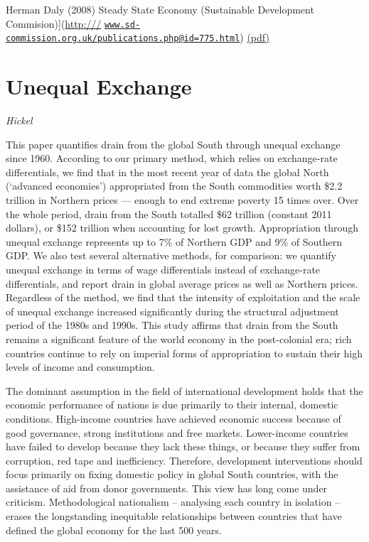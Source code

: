 \documentclass[
]{book}
\begin{document}
Herman Daly (2008) Steady State Economy (Sustainable Development Commision){]}(\url{http:///}
\href{mailto:www.sd-commission.org.uk/publications.php@id=775.html}{\nolinkurl{www.sd-commission.org.uk/publications.php@id=775.html}})
\href{pdf/Daly_2008_Steady_State_Economy_SD_Commision.pdf}{(pdf)}

\hypertarget{unequal-exchange}{%
\section{Unequal Exchange}\label{unequal-exchange}}

\emph{Hickel}

This paper quantifies drain from the global South through unequal
exchange since 1960. According to our primary method, which relies on
exchange-rate differentials, we find that in the most recent year of data
the global North (`advanced economies') appropriated from the South
commodities worth \$2.2 trillion in Northern prices --- enough to end
extreme poverty 15 times over. Over the whole period, drain from the
South totalled \$62 trillion (constant 2011 dollars), or \$152 trillion when
accounting for lost growth. Appropriation through unequal exchange
represents up to 7\% of Northern GDP and 9\% of Southern GDP. We also
test several alternative methods, for comparison: we quantify unequal
exchange in terms of wage differentials instead of exchange-rate
differentials, and report drain in global average prices as well as
Northern prices. Regardless of the method, we find that the intensity of
exploitation and the scale of unequal exchange increased significantly
during the structural adjustment period of the 1980s and 1990s. This
study affirms that drain from the South remains a significant feature of
the world economy in the post-colonial era; rich countries continue to
rely on imperial forms of appropriation to sustain their high levels of
income and consumption.

The dominant assumption in the field of international development
holds that the economic performance of nations is due primarily to
their internal, domestic conditions.
High-income countries have achieved economic success because of good governance,
strong institutions and free markets.
Lower-income countries have failed to develop because they lack these things, or
because they suffer from corruption, red tape and inefficiency.
Therefore, development interventions should focus primarily on fixing domestic
policy in global South countries, with the assistance of aid from donor governments.
This view has long come under criticism.
Methodological nationalism -- analysing each country in
isolation -- erases the longstanding inequitable relationships between
countries that have defined the global economy for the last 500 years.
\end{document}
